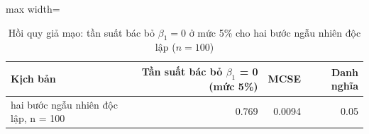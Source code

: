 \begin{table}[H]
\centering\footnotesize
\caption{Hồi quy giả mạo: tần suất bác bỏ $\beta_1=0$ ở mức 5\% cho hai bước ngẫu nhiên độc lập ($n=100$)}\label{tab:tab_b12_02_spurious_regression}
\begin{adjustbox}{max width=\linewidth}
\begin{tabular}{|>{\raggedright\arraybackslash}p{}|r|r|r|}
\toprule
Kịch bản & Tần suất bác bỏ $\beta_{1}$ = 0 (mức 5\%) & MCSE & Danh nghĩa \\
\midrule
hai bước ngẫu nhiên độc lập, n = 100 & 0.769 & 0.0094 & 0.05 \\[3pt]
\bottomrule
\end{tabular}
\end{adjustbox}
\end{table}
